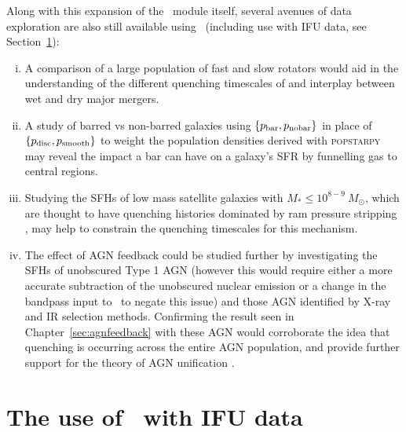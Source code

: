 Along with this expansion of the \starpy\ module itself, several avenues of data exploration are also still available using \starpy\ (including use with IFU data, see Section~\ref{sec:IFU}):
\begin{enumerate}[(i)]

\item A comparison of a large population of fast and slow rotators would aid in the understanding of the different quenching timescales of and interplay between wet and dry major mergers. 

\item A study of barred vs non-barred galaxies using $\{p_{\rm{bar}}, p_{\rm{no bar}}\}$ in place of $\{p_{\rm{disc}}, p_{\rm{smooth}}\}$ to weight the population densities derived with \textsc{popstarpy} may reveal the impact a bar can have on a galaxy's SFR by funnelling gas to central regions.

\item Studying the SFHs of low mass satellite galaxies with $M_* \leq 10^{8-9} ~M_{\odot}$, which are thought to have quenching histories dominated by ram pressure stripping \citep{hester06, fillingham16}, may help to constrain the quenching timescales for this mechanism. 

\item The effect of AGN feedback could be studied further by investigating the SFHs of unobscured Type 1 AGN (however this would require either a more accurate subtraction of the unobscured nuclear emission or a change in the bandpass input to \starpy\ to negate this issue) and those AGN identified by X-ray and IR selection methods. Confirming the result seen in Chapter~\ref{sec:agnfeedback} with these AGN would corroborate the idea that quenching is occurring across the entire AGN population, and provide further support for the theory of AGN unification \citep{antonucci93, urry95}.

\end{enumerate}

\section{The use of \starpy\ with IFU data}\label{sec:IFU}

